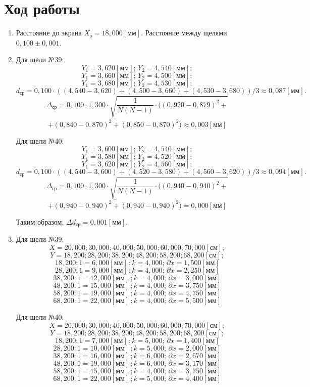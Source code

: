 \documentclass[12pt]{article}
\begin{document}
    \section*{Ход работы}

    \begin{enumerate}[wide, labelwidth=!, labelindent=0pt]
        \item Расстояние до экрана $ X_э = 18,000 [мм] $. Расстояние между щелями $ 0,100 \pm 0,001 $.
        \item Для щели №39:
        $$ Y_1  = 3,620 [мм]; \, Y_2 = 4,540 [мм]; $$
        $$ Y_1  = 3,660 [мм]; \, Y_2 = 4,500 [мм]; $$
        $$ Y_1  = 3,680 [мм]; \, Y_2 = 4,530 [мм]; $$
        $$ d_{ср} = 0,100 \cdot ((4,540 - 3,620 ) + (4,500 - 3,660 ) + (4,530 - 3,680) ) / 3 \approx 0,087 [мм] .$$
        $$ \Delta_{ср} = 0,100 \cdot 1,300 \cdot \sqrt{\frac{1}{N(N-1)} \cdot ((0,920 - 0,879)^2 +}$$
        $$ \overline{+ (0,840 - 0,870)^2 + (0,850 - 0,870)^2)} \approx 0,003 [мм] $$

        Для щели №40:
        $$ Y_1  = 3,600 [мм]; \, Y_2 = 4,540 [мм]; $$
        $$ Y_1  = 3,580 [мм]; \, Y_2 = 4,520 [мм]; $$
        $$ Y_1  = 3,620 [мм]; \, Y_2 = 4,560 [мм]; $$
        $$ d_{ср} = 0,100 \cdot ((4,540 - 3,600 ) + (4,520 - 3,580 ) + (4,560 - 3,620) ) / 3 \approx 0,094 [мм] .$$
        $$ \Delta_{ср} = 0,100 \cdot 1,300 \cdot \sqrt{\frac{1}{N(N-1)} \cdot ((0,940 - 0,940)^2 +}$$
        $$ \overline{+ (0,940 - 0,940)^2 + (0,940 - 0,940)^2)} = 0,000 [мм] $$

        Таким образом, $ \Delta d_{ср} = 0,001 [мм] $.

        \item Для щели №39:
        $$ X = 20,000; 30,000; 40,000; 50,000; 60,000; 70,000 [см] ;$$
        $$ Y = 18,200; 28,200; 38,200; 48,200; 58,200; 68,200 [см] ;$$
        $$ 18,200 : 1 = 6,000[мм] \, ; k = 4,000 ; \, \partial x = 1,500 [мм]  $$
        $$ 28,200 : 1 = 9,000[мм] \, ; k = 4,000 ; \, \partial x = 2,250 [мм]  $$
        $$ 38,200 : 1 = 12,000[мм] \, ; k = 4,000 ; \, \partial x = 3,000 [мм]  $$
        $$ 48,200 : 1 = 15,000[мм] \, ; k = 4,000 ; \, \partial x = 3,750 [мм]  $$
        $$ 58,200 : 1 = 19,000[мм] \, ; k = 4,000 ; \, \partial x = 4,750 [мм]  $$
        $$ 68,200 : 1 = 22,000[мм] \, ; k = 4,000 ; \, \partial x = 5,500 [мм]  $$

        Для щели №40:
        $$ X = 20,000; 30,000; 40,000; 50,000; 60,000; 70,000 [см] ;$$
        $$ Y = 18,200; 28,200; 38,200; 48,200; 58,200; 68,200 [см] ;$$
        $$ 18,200 : 1 = 7,000[мм] \, ; k = 5,000 ; \, \partial x = 1,400 [мм]  $$
        $$ 28,200 : 1 = 10,000[мм] \, ; k = 5,000 ; \, \partial x = 2,000 [мм]  $$
        $$ 38,200 : 1 = 16,000[мм] \, ; k = 6,000 ; \, \partial x = 2,670 [мм]  $$
        $$ 48,200 : 1 = 19,000[мм] \, ; k = 6,000 ; \, \partial x = 3,170 [мм]  $$
        $$ 58,200 : 1 = 15,000[мм] \, ; k = 4,000 ; \, \partial x = 3,750 [мм]  $$
        $$ 68,200 : 1 = 22,000[мм] \, ; k = 5,000 ; \, \partial x = 4,400 [мм]  $$


\end{enumerate}
\end{document}
